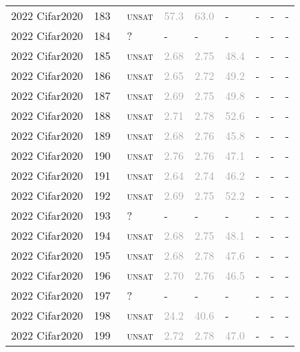 \begin{center}
{\begin{longtable}{@{}lllllllll@{}}
2022 Cifar2020 & 183 & ~\textsc{unsat} & \textcolor{darkgray}{57.3} & \textcolor{darkgray}{63.0} & - & - & - & - \\
2022 Cifar2020 & 184 & ~? & - & - & - & - & - & - \\
2022 Cifar2020 & 185 & ~\textsc{unsat} & \textcolor{darkgray}{2.68} & \textcolor{darkgray}{2.75} & \textcolor{darkgray}{48.4} & - & - & - \\
2022 Cifar2020 & 186 & ~\textsc{unsat} & \textcolor{darkgray}{2.65} & \textcolor{darkgray}{2.72} & \textcolor{darkgray}{49.2} & - & - & - \\
2022 Cifar2020 & 187 & ~\textsc{unsat} & \textcolor{darkgray}{2.69} & \textcolor{darkgray}{2.75} & \textcolor{darkgray}{49.8} & - & - & - \\
2022 Cifar2020 & 188 & ~\textsc{unsat} & \textcolor{darkgray}{2.71} & \textcolor{darkgray}{2.78} & \textcolor{darkgray}{52.6} & - & - & - \\
2022 Cifar2020 & 189 & ~\textsc{unsat} & \textcolor{darkgray}{2.68} & \textcolor{darkgray}{2.76} & \textcolor{darkgray}{45.8} & - & - & - \\
2022 Cifar2020 & 190 & ~\textsc{unsat} & \textcolor{darkgray}{2.76} & \textcolor{darkgray}{2.76} & \textcolor{darkgray}{47.1} & - & - & - \\
2022 Cifar2020 & 191 & ~\textsc{unsat} & \textcolor{darkgray}{2.64} & \textcolor{darkgray}{2.74} & \textcolor{darkgray}{46.2} & - & - & - \\
2022 Cifar2020 & 192 & ~\textsc{unsat} & \textcolor{darkgray}{2.69} & \textcolor{darkgray}{2.75} & \textcolor{darkgray}{52.2} & - & - & - \\
2022 Cifar2020 & 193 & ~? & - & - & - & - & - & - \\
2022 Cifar2020 & 194 & ~\textsc{unsat} & \textcolor{darkgray}{2.68} & \textcolor{darkgray}{2.75} & \textcolor{darkgray}{48.1} & - & - & - \\
2022 Cifar2020 & 195 & ~\textsc{unsat} & \textcolor{darkgray}{2.68} & \textcolor{darkgray}{2.78} & \textcolor{darkgray}{47.6} & - & - & - \\
2022 Cifar2020 & 196 & ~\textsc{unsat} & \textcolor{darkgray}{2.70} & \textcolor{darkgray}{2.76} & \textcolor{darkgray}{46.5} & - & - & - \\
2022 Cifar2020 & 197 & ~? & - & - & - & - & - & - \\
2022 Cifar2020 & 198 & ~\textsc{unsat} & \textcolor{darkgray}{24.2} & \textcolor{darkgray}{40.6} & - & - & - & - \\
2022 Cifar2020 & 199 & ~\textsc{unsat} & \textcolor{darkgray}{2.72} & \textcolor{darkgray}{2.78} & \textcolor{darkgray}{47.0} & - & - & - \\

\end{longtable}}
\end{center}
